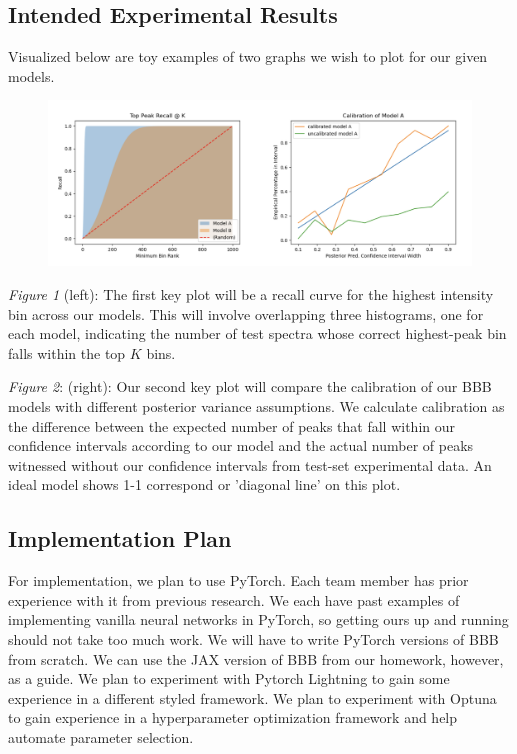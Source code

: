 \documentclass{article}
\begin{document}
\subsection{Intended Experimental Results}
Visualized below are toy examples of two graphs we wish to plot for our given models.
\begin{figure}[H]
  \centering
  \centerline{\includegraphics[scale=0.8]{two_plots.png}}
\end{figure}
\textit{Figure 1} (left): The first key plot will be a recall curve for the highest intensity bin across our models. This will involve overlapping three histograms, one for each model, indicating the number of test spectra whose correct highest-peak bin falls within the top $K$ bins.

\textit{Figure 2}: (right): Our second key plot will compare the calibration of our BBB models with different posterior variance assumptions. We calculate calibration as the difference between the expected number of peaks that fall within our confidence intervals according to our model and the actual number of peaks witnessed without our confidence intervals from test-set experimental data. An ideal model shows 1-1 correspond or 'diagonal line' on this plot. 
\subsection{Implementation Plan}
For implementation, we plan to use PyTorch. Each team member has prior experience with it from previous research. We each have past examples of implementing vanilla neural networks in PyTorch, so getting ours up and running should not take too much work. We will have to write PyTorch versions of BBB from scratch. We can use the JAX version of BBB from our homework, however, as a guide. We plan to experiment with Pytorch Lightning to gain some experience in a different styled framework. We plan to experiment with Optuna to gain experience in a hyperparameter optimization framework and help automate parameter selection.
\end{document}
